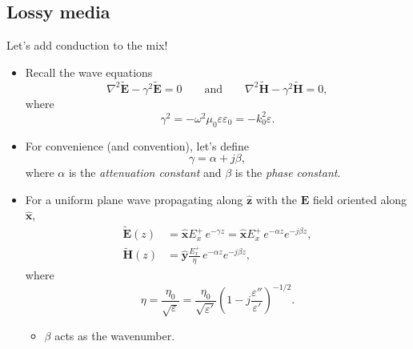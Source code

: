 \documentclass[11pt, oneside]{article}
\begin{document}
\subsection{Lossy media}

Let's add conduction to the mix!
\begin{itemize}
	\item Recall the wave equations
	\begin{equation}
		\nabla^2\tilde{\mathbf{E}} - \gamma^2\tilde{\mathbf{E}} = 0
		\qquad \text{and} \qquad
		\nabla^2\tilde{\mathbf{H}} - \gamma^2\tilde{\mathbf{H}} = 0,
	\end{equation}
	where
	\begin{equation}
		\gamma^2 = -\omega^2\mu_0\varepsilon\varepsilon_0 = -k_0^2\varepsilon.
	\end{equation}
	\item For convenience (and convention), let's define
	\begin{equation}
		\gamma = \alpha + j\beta,
	\end{equation}
	where $\alpha$ is the \emph{attenuation constant} and $\beta$ is the \emph{phase constant}.
	\item For a uniform plane wave propagating along $\hat{\mathbf{z}}$ with the $\mathbf{E}$ field oriented along $\hat{\mathbf{x}}$,
	\begin{align}
		\label{e:plane_lossy}
		\tilde{\mathbf{E}}(z) &= \hat{\mathbf{x}}E_x^+\,e^{-\gamma z} = \hat{\mathbf{x}}E_x^+\,e^{-\alpha z}e^{-j\beta z}, \\
		\tilde{\mathbf{H}}(z) &= \hat{\mathbf{y}}\frac{E_x^+}{\eta}\,e^{-\alpha z}e^{-j\beta z},
	\end{align}
	where
	\begin{equation}
		\label{e:eta_lossy}
		\eta = \frac{\eta_0}{\sqrt{\varepsilon}} = \frac{\eta_0}{\sqrt{\varepsilon'}}\left(1 - j\frac{\varepsilon''}{\varepsilon'}\right)^{-1/2}.
	\end{equation}
	\begin{itemize}
		\item $\beta$ acts as the wavenumber.

\end{itemize}
\end{itemize}
\end{document}
